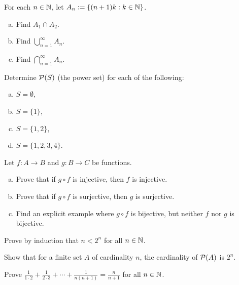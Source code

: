 \begin{exercise}
For each $n \in {\mathbb{N}}$, let $A_n := \{ (n+1)k : k \in {\mathbb{N}} \}$.
\begin{enumerate}[a)]
\item Find $A_1 \cap A_2$.
\item Find $\bigcup_{n=1}^\infty A_n$.
\item Find $\bigcap_{n=1}^\infty A_n$.
\end{enumerate}
\end{exercise}

\begin{samepage}
\begin{exercise}
Determine ${\mathcal{P}}(S)$ (the power set) for each of the following:
\begin{enumerate}[a)]
\item $S = \emptyset$,
\item $S = \{1\}$,
\item $S = \{1,2\}$,
\item $S = \{1,2,3,4\}$.
\end{enumerate}
\end{exercise}
\end{samepage}


\begin{exercise}
Let $f \colon A \to B$ and $g \colon B \to C$ be functions.
\begin{enumerate}[a)]
\item
Prove that if $g \circ f$ is injective, then $f$ is injective.
\item
Prove that if $g \circ f$ is surjective, then $g$ is surjective.
\item
Find an explicit example where $g \circ f$ is bijective, but neither $f$
nor $g$ is bijective.
\end{enumerate}
\end{exercise}

\begin{exercise}
Prove by induction that $n < 2^n$ for all $n \in {\mathbb{N}}$.
\end{exercise}

\begin{exercise}
Show that for a finite set $A$ of cardinality $n$, the cardinality
of ${\mathcal{P}}(A)$ is $2^n$.
\end{exercise}

\begin{exercise}
Prove $\frac{1}{1\cdot 2} + 
\frac{1}{2\cdot 3} + \cdots + \frac{1}{n(n+1)} = \frac{n}{n+1}$
for all $n \in {\mathbb{N}}$.
\end{exercise}

